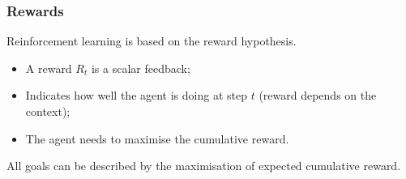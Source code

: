 \begin{frame}
\begin{columns}
    \end{columns}
\end{frame}






\begin{frame}

    \frametitle{Rewards}

    Reinforcement learning is based on the reward hypothesis.

    \begin{itemize}
        \item A reward $R_t$ is a scalar feedback;
        \item Indicates how well the agent is doing at step $t$ (reward depends on the context);
        \item The agent needs to maximise the cumulative reward.
    \end{itemize}

    \begin{definition}
        All goals can be described by the maximisation of expected cumulative reward.
    \end{definition}


\end{frame}


